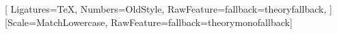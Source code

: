 \setmainfont{Charis SIL}[
  Ligatures=TeX,
  Numbers=OldStyle,
  RawFeature={fallback=theoryfallback},
]
\setmonofont{DejaVu Sans Mono}[Scale=MatchLowercase, RawFeature={fallback=theorymonofallback}]

%
%
%
\areaset[current]{430pt}{720pt}
\setlength{\marginparwidth}{0pt}
\setlength{\marginparsep}{0pt}

\let\eth\relax
\usepackage{amsmath,amsthm}
\usepackage{unicode-math}
\usepackage{array,booktabs,longtable}
\usepackage{ragged2e}

\raggedbottom

